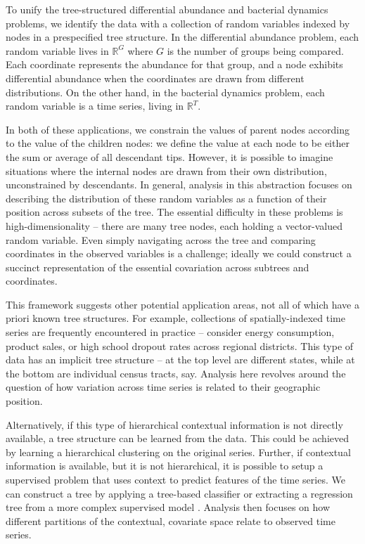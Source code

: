 \documentclass[12pt]{article}
\begin{document}
To unify the tree-structured differential abundance and bacterial dynamics
problems, we identify the data with a collection of random variables indexed by
nodes in a prespecified tree structure. In the differential abundance problem,
each random variable lives in $\mathbb{R}^{G}$ where $G$ is the number of
groups being compared. Each coordinate represents the abundance for that group,
and a node exhibits differential abundance when the coordinates are drawn from
different distributions. On the other hand, in the bacterial dynamics problem,
each random variable is a time series, living in $\mathbb{R}^{T}$.

In both of these applications, we constrain the values of parent nodes according
to the value of the children nodes: we define the value at each node to be
either the sum or average of all descendant tips. However, it is possible to
imagine situations where the internal nodes are drawn from their own
distribution, unconstrained by descendants. In general, analysis in this
abstraction focuses on describing the distribution of these random variables as
a function of their position across subsets of the tree. The essential
difficulty in these problems is high-dimensionality -- there are many tree
nodes, each holding a vector-valued random variable. Even simply navigating
across the tree and comparing coordinates in the observed variables is a
challenge; ideally we could construct a succinct representation of the essential
covariation across subtrees and coordinates.

This framework suggests other potential application areas, not all of which have
a priori known tree structures. For example, collections of spatially-indexed
time series are frequently encountered in practice -- consider energy
consumption, product sales, or high school dropout rates across regional
districts. This type of data has an implicit tree structure -- at the top level
are different states, while at the bottom are individual census tracts, say.
Analysis here revolves around the question of how variation across time series
is related to their geographic position.

Alternatively, if this type of hierarchical contextual information is not
directly available, a tree structure can be learned from the data. This could be
achieved by learning a hierarchical clustering on the original series. Further,
if contextual information is available, but it is not hierarchical, it is
possible to setup a supervised problem that uses context to predict features of
the time series. We can construct a tree by applying a tree-based classifier
\citep{breiman1984classification} or extracting a regression tree from a more
complex supervised model \citep{boz2002extracting,saito2002extracting}. Analysis
then focuses on how different partitions of the contextual, covariate space
relate to observed time series.
\end{document}
